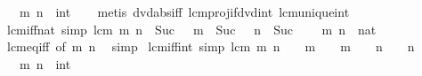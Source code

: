\begin{isabellebody}
\ \ \ m\ n\ {\isacharcolon}{\kern0pt}{\isacharcolon}{\kern0pt}\ int\isanewline
%
\isadelimproof
\ \ %
\endisadelimproof
%
\isatagproof
{}\isamarkupfalse%
\ {\isacharparenleft}{\kern0pt}metis\ dvd{\isacharunderscore}{\kern0pt}abs{\isacharunderscore}{\kern0pt}iff\ lcm{\isacharunderscore}{\kern0pt}proj{}{\isacharunderscore}{\kern0pt}if{\isacharunderscore}{\kern0pt}dvd{\isacharunderscore}{\kern0pt}int\ lcm{\isacharunderscore}{\kern0pt}unique{\isacharunderscore}{\kern0pt}int{\isacharparenright}{\kern0pt}%
\endisatagproof
{\isafoldproof}%
%
\isadelimproof
\isanewline
%
\endisadelimproof
\isanewline
{}\isamarkupfalse%
\ lcm{\isacharunderscore}{\kern0pt}{}{\isacharunderscore}{\kern0pt}iff{\isacharunderscore}{\kern0pt}nat\ {\isacharbrackleft}{\kern0pt}simp{\isacharbrackright}{\kern0pt}{\isacharcolon}{\kern0pt}\ {\isachardoublequoteopen}lcm\ m\ n\ {\isacharequal}{\kern0pt}\ Suc\ {}\ {\isasymlongleftrightarrow}\ m\ {\isacharequal}{\kern0pt}\ Suc\ {}\ {\isasymand}\ n\ {\isacharequal}{\kern0pt}\ Suc\ {}{\isachardoublequoteclose}\isanewline
\ \ \ m\ n\ {\isacharcolon}{\kern0pt}{\isacharcolon}{\kern0pt}\ nat\isanewline
%
\isadelimproof
\ \ %
\endisadelimproof
%
\isatagproof
{}\isamarkupfalse%
\ lcm{\isacharunderscore}{\kern0pt}eq{\isacharunderscore}{\kern0pt}{}{\isacharunderscore}{\kern0pt}iff\ {\isacharbrackleft}{\kern0pt}of\ m\ n{\isacharbrackright}{\kern0pt}\ \isamarkupfalse%
\ simp%
\endisatagproof
{\isafoldproof}%
%
\isadelimproof
\isanewline
%
\endisadelimproof
\isanewline
{}\isamarkupfalse%
\ lcm{\isacharunderscore}{\kern0pt}{}{\isacharunderscore}{\kern0pt}iff{\isacharunderscore}{\kern0pt}int\ {\isacharbrackleft}{\kern0pt}simp{\isacharbrackright}{\kern0pt}{\isacharcolon}{\kern0pt}\ {\isachardoublequoteopen}lcm\ m\ n\ {\isacharequal}{\kern0pt}\ {}\ {\isasymlongleftrightarrow}\ {\isacharparenleft}{\kern0pt}m\ {\isacharequal}{\kern0pt}\ {}\ {\isasymor}\ m\ {\isacharequal}{\kern0pt}\ {\isacharminus}{\kern0pt}{}{\isacharparenright}{\kern0pt}\ {\isasymand}\ {\isacharparenleft}{\kern0pt}n\ {\isacharequal}{\kern0pt}\ {}\ {\isasymor}\ n\ {\isacharequal}{\kern0pt}\ {\isacharminus}{\kern0pt}{}{\isacharparenright}{\kern0pt}{\isachardoublequoteclose}\isanewline
\ \ \ m\ n\ {\isacharcolon}{\kern0pt}{\isacharcolon}{\kern0pt}\ int\isanewline
%
\isadelimproof
\ \ %
\endisadelimproof
%
\isatagproof
{}\isamarkupfalse%

\end{isabellebody}
